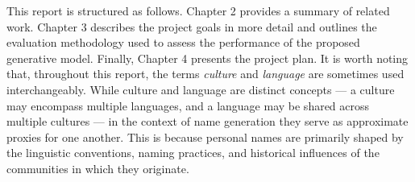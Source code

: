 \documentclass[Main.tex]{subfiles}
\begin{document}
This report is structured as follows. Chapter 2 provides a summary of related work. Chapter 3 describes the project goals in more detail and outlines the evaluation methodology used to assess the performance of the proposed generative model. Finally, Chapter 4 presents the project plan. It is worth noting that, throughout this report, the terms \textit{culture} and \textit{language} are sometimes used interchangeably. While culture and language are distinct concepts — a culture may encompass multiple languages, and a language may be shared across multiple cultures — in the context of name generation they serve as approximate proxies for one another. This is because personal names are primarily shaped by the linguistic conventions, naming practices, and historical influences of the communities in which they originate.\\

\end{document}
